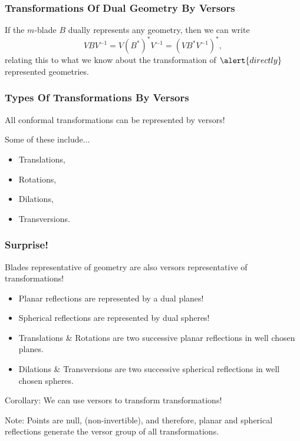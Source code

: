 \documentclass{beamer}
\begin{document}
\begin{frame}
\frametitle{Transformations Of \alert{Dual} Geometry By Versors}
If the $m$-blade $B$ \alert{dually} represents any geometry, then we can write
\begin{equation*}
VBV^{-1} = V(B^*)^*V^{-1} = (VB^*V^{-1})^*,
\end{equation*}
relating this to what we know about the transformation of $\alert{directly}$ represented geometries.
\end{frame}

\begin{frame}
\frametitle{Types Of Transformations By Versors}
All conformal transformations can be represented by \alert{versors}!

Some of these include...
\begin{itemize}
\item \alert{Translations},
\item \alert{Rotations},
\item \alert{Dilations},
\item \alert{Transversions}.
\end{itemize}
\end{frame}

\begin{frame}
\frametitle{Surprise!}
\alert{Blades} representative of geometry are also \alert{versors} representative of transformations!\pause
\begin{itemize}
\item \alert{Planar reflections} are represented by a dual planes!\pause
\item \alert{Spherical reflections} are represented by dual spheres!\pause
\item \alert{Translations} \& \alert{Rotations} are two successive planar reflections in well chosen planes.\pause
\item \alert{Dilations} \& \alert{Transversions} are two successive spherical reflections in well chosen spheres.\pause
\end{itemize}
\alert{Corollary}: We can use versors to transform transformations!\pause

\alert{Note}: Points are null, (non-invertible), and therefore, planar and spherical reflections \alert{generate} the versor group of all transformations.
\end{frame}
\end{document}
